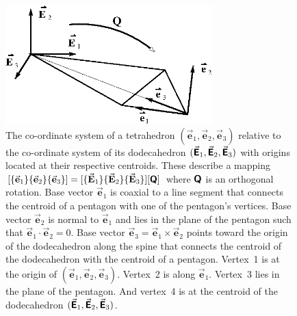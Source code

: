 \begin{figure}
    \centering
    \includegraphics[width=8cm]{figures/tetrahedronCoord.png}
    \caption{The co-ordinate system of a tetrahedron $( \vec{\mathbf{e}}_1 , \vec{\mathbf{e}}_2 , \vec{\mathbf{e}}_3 )$ relative to the co-ordinate system of its dodecahedron $( \vec{\boldsymbol{\mathsf{E}}}_1 , \vec{\boldsymbol{\mathsf{E}}}_2 , \vec{\boldsymbol{\mathsf{E}}}_3 )$ with origins located at their respective centroids.  These describe a mapping $[ \{ \vec{\mathbf{e}}_1 \} \{ \vec{\mathbf{e}}_2 \} \{ \vec{\mathbf{e}}_3 \} ] = [ \{ \vec{\mathbf{E}}_1 \} \{ \vec{\mathbf{E}}_2 \} \{ \vec{\mathbf{E}}_3 \} ] [ \boldsymbol{\mathsf{Q}} ]$ where $\boldsymbol{\mathsf{Q}}$ is an orthogonal rotation.  Base vector $\vec{\mathbf{e}}_1$ is coaxial to a line segment that connects the centroid of a pentagon with one of the pentagon's vertices.  Base vector  $\vec{\mathbf{e}}_2$ is normal to  $\vec{\mathbf{e}}_1$ and lies in the plane of the pentagon such that $\vec{\mathbf{e}}_1 \cdot \vec{\mathbf{e}}_2 = 0$.  Base vector $\vec{\mathbf{e}}_3 = \vec{\mathbf{e}}_1 \times \vec{\mathbf{e}}_2$ points toward the origin of the dodecahedron along the spine that connects the centroid of the dodecahedron with the centroid of a pentagon.  Vertex~1 is at the origin of $( \vec{\mathbf{e}}_1 , \vec{\mathbf{e}}_2 , \vec{\mathbf{e}}_3 )$.  Vertex~2 is along $\vec{\mathbf{e}}_1$.  Vertex~3 lies in the plane of the pentagon.  And vertex~4 is at the centroid of the dodecahedron $( \vec{\boldsymbol{\mathsf{E}}}_1 , \vec{\boldsymbol{\mathsf{E}}}_2 , \vec{\boldsymbol{\mathsf{E}}}_3 )$.}
    \label{figTetrahedronCoord}
\end{figure}

